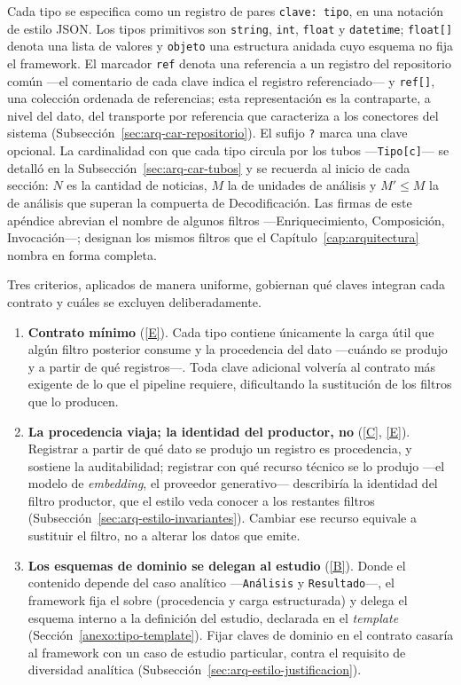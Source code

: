 \documentclass[12pt]{report}
\DeclareRobustCommand{\resp}[1]{\hyperref[tab:registro-responsabilidades]{\textcolor{respcolor}{[#1]}}}
\begin{document}
Cada tipo se especifica como un registro de pares \texttt{clave: tipo}, en una notación de estilo JSON. Los tipos primitivos son \texttt{string}, \texttt{int}, \texttt{float} y \texttt{datetime}; \texttt{float[]} denota una lista de valores y \texttt{objeto} una estructura anidada cuyo esquema no fija el framework. El marcador \texttt{ref} denota una referencia a un registro del repositorio común ---el comentario de cada clave indica el registro referenciado--- y \texttt{ref[]}, una colección ordenada de referencias; esta representación es la contraparte, a nivel del dato, del transporte por referencia que caracteriza a los conectores del sistema (Subsección~\ref{sec:arq-car-repositorio}). El sufijo \texttt{?} marca una clave opcional. La cardinalidad con que cada tipo circula por los tubos ---\texttt{Tipo[c]}--- se detalló en la Subsección~\ref{sec:arq-car-tubos} y se recuerda al inicio de cada sección: \(N\) es la cantidad de noticias, \(M\) la de unidades de análisis y \(M' \le M\) la de análisis que superan la compuerta de Decodificación. Las firmas de este apéndice abrevian el nombre de algunos filtros ---Enriquecimiento, Composición, Invocación---; designan los mismos filtros que el Capítulo~\ref{cap:arquitectura} nombra en forma completa.

Tres criterios, aplicados de manera uniforme, gobiernan qué claves integran cada contrato y cuáles se excluyen deliberadamente.

\begin{enumerate}
  \item \textbf{Contrato mínimo} (\resp{E}). Cada tipo contiene únicamente la carga útil que algún filtro posterior consume y la procedencia del dato ---cuándo se produjo y a partir de qué registros---. Toda clave adicional volvería al contrato más exigente de lo que el pipeline requiere, dificultando la sustitución de los filtros que lo producen.
  \item \textbf{La procedencia viaja; la identidad del productor, no} (\resp{C}, \resp{E}). Registrar a partir de qué dato se produjo un registro es procedencia, y sostiene la auditabilidad; registrar con qué recurso técnico se lo produjo ---el modelo de \textit{embedding}, el proveedor generativo--- describiría la identidad del filtro productor, que el estilo veda conocer a los restantes filtros (Subsección~\ref{sec:arq-estilo-invariantes}). Cambiar ese recurso equivale a sustituir el filtro, no a alterar los datos que emite.
  \item \textbf{Los esquemas de dominio se delegan al estudio} (\resp{B}). Donde el contenido depende del caso analítico ---\texttt{Análisis} y \texttt{Resultado}---, el framework fija el sobre (procedencia y carga estructurada) y delega el esquema interno a la definición del estudio, declarada en el \textit{template} (Sección~\ref{anexo:tipo-template}). Fijar claves de dominio en el contrato casaría al framework con un caso de estudio particular, contra el requisito de diversidad analítica (Subsección~\ref{sec:arq-estilo-justificacion}).
\end{enumerate}
\end{document}
